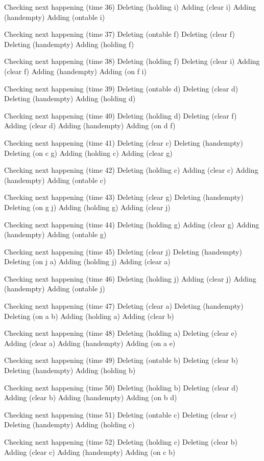 Checking next happening (time 36)
Deleting (holding i)
Adding (clear i)
Adding (handempty)
Adding (ontable i)

Checking next happening (time 37)
Deleting (ontable f)
Deleting (clear f)
Deleting (handempty)
Adding (holding f)

Checking next happening (time 38)
Deleting (holding f)
Deleting (clear i)
Adding (clear f)
Adding (handempty)
Adding (on f i)

Checking next happening (time 39)
Deleting (ontable d)
Deleting (clear d)
Deleting (handempty)
Adding (holding d)

Checking next happening (time 40)
Deleting (holding d)
Deleting (clear f)
Adding (clear d)
Adding (handempty)
Adding (on d f)

Checking next happening (time 41)
Deleting (clear c)
Deleting (handempty)
Deleting (on c g)
Adding (holding c)
Adding (clear g)

Checking next happening (time 42)
Deleting (holding c)
Adding (clear c)
Adding (handempty)
Adding (ontable c)

Checking next happening (time 43)
Deleting (clear g)
Deleting (handempty)
Deleting (on g j)
Adding (holding g)
Adding (clear j)

Checking next happening (time 44)
Deleting (holding g)
Adding (clear g)
Adding (handempty)
Adding (ontable g)

Checking next happening (time 45)
Deleting (clear j)
Deleting (handempty)
Deleting (on j a)
Adding (holding j)
Adding (clear a)

Checking next happening (time 46)
Deleting (holding j)
Adding (clear j)
Adding (handempty)
Adding (ontable j)

Checking next happening (time 47)
Deleting (clear a)
Deleting (handempty)
Deleting (on a b)
Adding (holding a)
Adding (clear b)

Checking next happening (time 48)
Deleting (holding a)
Deleting (clear e)
Adding (clear a)
Adding (handempty)
Adding (on a e)

Checking next happening (time 49)
Deleting (ontable b)
Deleting (clear b)
Deleting (handempty)
Adding (holding b)

Checking next happening (time 50)
Deleting (holding b)
Deleting (clear d)
Adding (clear b)
Adding (handempty)
Adding (on b d)

Checking next happening (time 51)
Deleting (ontable c)
Deleting (clear c)
Deleting (handempty)
Adding (holding c)

Checking next happening (time 52)
Deleting (holding c)
Deleting (clear b)
Adding (clear c)
Adding (handempty)
Adding (on c b)

